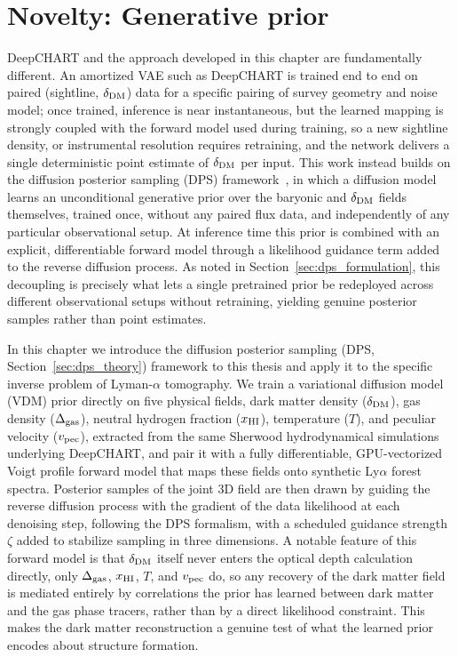 \section{Novelty: Generative prior}
DeepCHART and the approach developed in this chapter are fundamentally different. An amortized VAE such as DeepCHART is trained end to end on paired (sightline, $\delta_{\rm DM}$) data for a specific pairing of survey geometry and noise model; once trained, inference is near instantaneous, but the learned mapping is strongly coupled with the forward model used during training, so a new sightline density, or instrumental resolution requires retraining, and the network delivers a single deterministic point estimate of $\delta_{\rm DM}$ per input. This work instead builds on the diffusion posterior sampling (DPS) framework~\citep{chung_diffusion_2023}, in which a diffusion model learns an unconditional generative prior over the baryonic and $\delta_{\rm DM}$ fields themselves, trained once, without any paired flux data, and independently of any particular observational setup. At inference time this prior is combined with an explicit, differentiable forward model through a likelihood guidance term added to the reverse diffusion process. As noted in Section~\ref{sec:dps_formulation}, this decoupling is precisely what lets a single pretrained prior be redeployed across different observational setups without retraining, yielding genuine posterior samples rather than point estimates.

\vspace{\baselineskip}
In this chapter we introduce the diffusion posterior sampling (DPS, Section~\ref{sec:dps_theory}) framework to this thesis and apply it to the specific inverse problem of Lyman-$\alpha$ tomography. We train a variational diffusion model (VDM) prior directly on five physical fields, dark matter density ($\delta_{\rm DM}$), gas density ($\Delta_{\rm gas}$), neutral hydrogen fraction ($x_{\rm HI}$), temperature ($T$), and peculiar velocity ($v_{\rm pec}$), extracted from the same Sherwood hydrodynamical simulations underlying DeepCHART, and pair it with a fully differentiable, GPU-vectorized Voigt profile forward model that maps these fields onto synthetic Ly$\alpha$ forest spectra. Posterior samples of the joint 3D field are then drawn by guiding the reverse diffusion process with the gradient of the data likelihood at each denoising step, following the DPS formalism, with a scheduled guidance strength $\zeta$ added to stabilize sampling in three dimensions. A notable feature of this forward model is that $\delta_{\rm DM}$ itself never enters the optical depth calculation directly, only $\Delta_{\rm gas}$, $x_{\rm HI}$, $T$, and $v_{\rm pec}$ do, so any recovery of the dark matter field is mediated entirely by correlations the prior has learned between dark matter and the gas phase tracers, rather than by a direct likelihood constraint. This makes the dark matter reconstruction a genuine test of what the learned prior encodes about structure formation.

